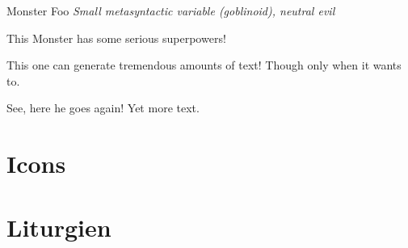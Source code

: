 \documentclass[10pt,%
  a4paper,%
  twoside,%
  openany%
  ]{book}
\begin{document}
\begin{multicols}{2}

\begin{monsterbox}{Monster Foo}
  \textit{Small metasyntactic variable (goblinoid), neutral evil}\\
  \basics[%
  armorclass = 12,
  hitpoints  = 16 (3d8 + 3),
  speed      = 50 ft
  ]
  \stats[
    STR = \stat{12}, %
    DEX = \stat{7}
  ]
  \details[%
  languages = {Common Lisp, Erlang},
  ]
  \begin{monsteraction}
    This Monster has some serious superpowers!
  \end{monsteraction}
  \begin{monsteraction}
    This one can generate tremendous amounts of text! Though only when it wants to.
  \end{monsteraction}

  \begin{monsteraction}
    See, here he goes again! Yet more text.
  \end{monsteraction}
\end{monsterbox}

\section{Icons}


\dsabauer

\dsaspringer

\dsakoenig

\dsaturm

\section{Liturgien}


\end{multicols}
\end{document}
